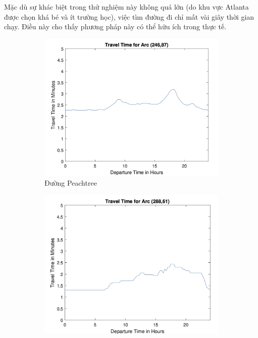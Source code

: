 \documentclass[../main.tex]{subfiles}
\begin{document}
Mặc dù sự khác biệt trong thử nghiệm này không quá lớn (do khu vực
Atlanta được chọn khá bé và ít trường học), việc tìm đường đi chỉ mất
vài giây thời gian chạy. Điều này cho thấy phương pháp này có thể hữu
ích trong thực tế.


\begin{figure}
    \centering
    \begin{subfigure}{0.45\textwidth}
        \centering
        \includegraphics{edited-images/Figure15a.jpg}
        \caption{Đường Peachtree}
        \label{fig:15a}
    \end{subfigure}
    \begin{subfigure}{0.45\textwidth}
        \centering
        \includegraphics{edited-images/Figure15b.jpg}

\end{subfigure}
\end{figure}
\end{document}
